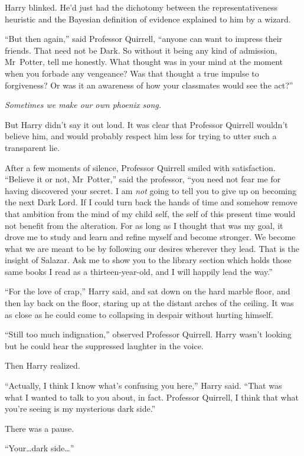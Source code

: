 Harry blinked. He’d just had the dichotomy between the representativeness heuristic and the Bayesian definition of evidence explained to him by a wizard.

“But then again,” said Professor Quirrell, “anyone can want to impress their friends. That need not be Dark. So without it being any kind of admission, Mr~Potter, tell me honestly. What thought was in your mind at the moment when you forbade any vengeance? Was that thought a true impulse to forgiveness? Or was it an awareness of how your classmates would see the act?”

\emph{Sometimes we make our own phoenix song.}

But Harry didn’t say it out loud. It was clear that Professor Quirrell wouldn’t believe him, and would probably respect him less for trying to utter such a transparent lie.

After a few moments of silence, Professor Quirrell smiled with satisfaction. “Believe it or not, Mr~Potter,” said the professor, “you need not fear me for having discovered your secret. I am \emph{not} going to tell you to give up on becoming the next Dark Lord. If I could turn back the hands of time and somehow remove that ambition from the mind of my child self, the self of this present time would not benefit from the alteration. For as long as I thought that was my goal, it drove me to study and learn and refine myself and become stronger. We become what we are meant to be by following our desires wherever they lead. That is the insight of Salazar. Ask me to show you to the library section which holds those same books I read as a thirteen-year-old, and I will happily lead the way.”

“For the love of crap,” Harry said, and sat down on the hard marble floor, and then lay back on the floor, staring up at the distant arches of the ceiling. It was as close as he could come to collapsing in despair without hurting himself.

“Still too much indignation,” observed Professor Quirrell. Harry wasn’t looking but he could hear the suppressed laughter in the voice.

Then Harry realized.

“Actually, I think I know what’s confusing you here,” Harry said. “That was what I wanted to talk to you about, in fact. Professor Quirrell, I think that what you’re seeing is my mysterious dark side.”

There was a pause.

“Your…dark side…”

